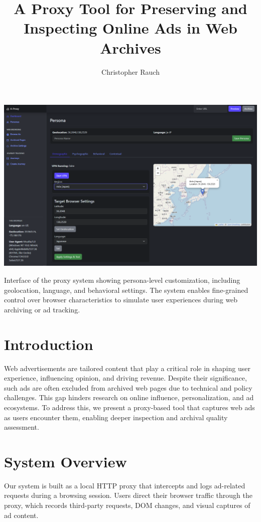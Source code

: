 \documentclass[sigconf]{acmart}
\title{A Proxy Tool for Preserving and Inspecting Online Ads in Web Archives}
\author{Christopher Rauch}
\affiliation{%
  \institution{Drexel University}
  \country{USA}
}
\begin{document}
\maketitle

\begin{teaserfigure}
  \centering
  \includegraphics[width=\textwidth]{persona-teaser.png}
  \caption{Interface of the proxy system showing persona-level customization, including geolocation, language, and behavioral settings. The system enables fine-grained control over browser characteristics to simulate user experiences during web archiving or ad tracking.}
  \label{fig:persona}
\end{teaserfigure}

\section{Introduction}
Web advertisements are tailored content that play a critical role in shaping user experience, influencing opinion, and driving revenue. Despite their significance, such ads are often excluded from archived web pages due to technical and policy challenges. This gap hinders research on online influence, personalization, and ad ecosystems. To address this, we present a proxy-based tool that captures web ads as users encounter them, enabling deeper inspection and archival quality assessment.

\section{System Overview}
Our system is built as a local HTTP proxy that intercepts and logs ad-related requests during a browsing session. Users direct their browser traffic through the proxy, which records third-party requests, DOM changes, and visual captures of ad content.
\end{document}
